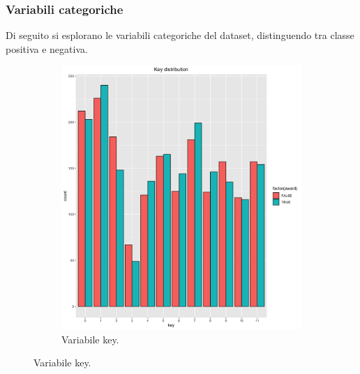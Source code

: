 \subsubsection{Variabili categoriche}
Di seguito si esplorano le variabili categoriche del dataset, distinguendo tra classe positiva e negativa.

\begin{figure}[!h]

	\begin{subfigure}[b]{\textwidth}
		\centering
		\includegraphics[width=10cm]{../images/key_distribution.png}
		\caption{Variabile key.}
	\end{subfigure}
      

\end{figure}
